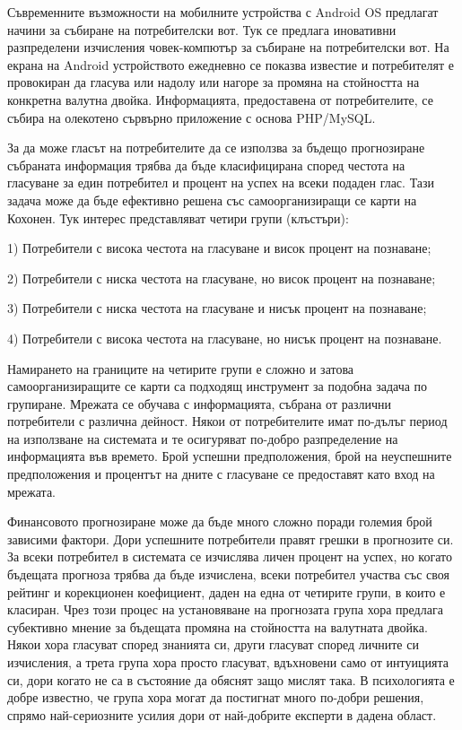 Съвременните възможности на мобилните устройства с Android OS предлагат начини за събиране на потребителски вот. Тук се предлага иновативни разпределени изчисления човек-компютър за събиране на потребителски вот. На екрана на Android устройството ежедневно се показва известие и потребителят е провокиран да гласува или
надолу или нагоре за промяна на стойността на конкретна валутна двойка. Информацията, предоставена от потребителите, се събира на олекотено сървърно приложение с основа PHP/MySQL.

За да може гласът на потребителите да се използва за бъдещо прогнозиране събраната информация трябва да бъде класифицирана според честота на гласуване за един потребител и процент на успех на всеки подаден глас. Тази задача може да бъде ефективно решена със самоорганизиращи се карти на Кохонен. Тук интерес представляват четири групи (клъстъри):

1) Потребители с висока честота на гласуване и висок процент на познаване;

2) Потребители с ниска честота на гласуване, но висок процент на познаване;

3) Потребители с ниска честота на гласуване и нисък процент на познаване;

4) Потребители с висока честота на гласуване, но нисък процент на познаване.

Намирането на границите на четирите групи е сложно и затова самоорганизиращите се карти са подходящ инструмент за подобна задача по групиране. Мрежата се обучава с информацията, събрана от различни потребители с различна дейност. Някои от потребителите имат по-дълъг период на използване на системата и те осигуряват по-добро разпределение на информацията във времето. Брой успешни предположения, брой на неуспешните предположения и процентът на дните с гласуване се предоставят като вход на мрежата.

Финансовото прогнозиране може да бъде много сложно поради големия брой зависими фактори. Дори успешните потребители правят грешки в прогнозите си. За всеки потребител в системата се изчислява личен процент на успех, но когато бъдещата прогноза трябва да бъде изчислена, всеки потребител участва със своя рейтинг и корекционен коефициент, даден на една от четирите групи, в които е класиран. Чрез този процес на установяване на прогнозата група хора предлага субективно мнение за бъдещата промяна на стойността на валутната двойка. Някои хора гласуват според знанията си, други гласуват според личните си изчисления, а трета група хора просто гласуват, вдъхновени само от интуицията си, дори когато не са в състояние да обяснят защо мислят така. В психологията е добре известно, че група хора могат да постигнат много по-добри решения, спрямо най-сериозните усилия дори от най-добрите експерти в дадена област.

